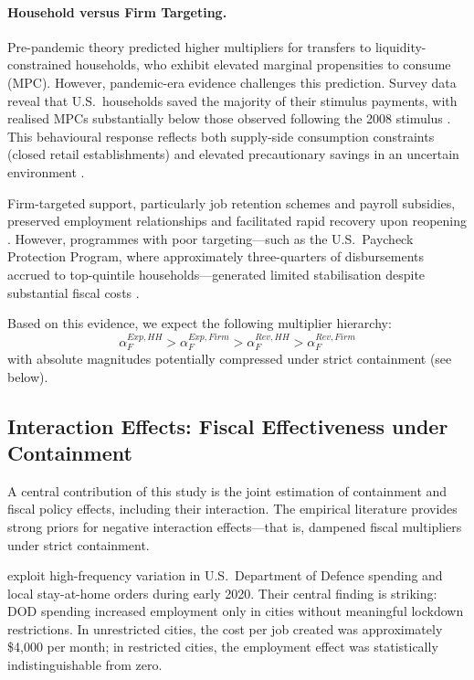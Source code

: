 \documentclass[12pt, a4paper]{article}
\begin{document}
\paragraph{Household versus Firm Targeting.}
Pre-pandemic theory predicted higher multipliers for transfers to liquidity-constrained households, who exhibit elevated marginal propensities to consume (MPC). However, pandemic-era evidence challenges this prediction. Survey data reveal that U.S.\ households saved the majority of their stimulus payments, with realised MPCs substantially below those observed following the 2008 stimulus \citep{Coibion2020}. This behavioural response reflects both supply-side consumption constraints (closed retail establishments) and elevated precautionary savings in an uncertain environment \citep{Chetty2020}.

Firm-targeted support, particularly job retention schemes and payroll subsidies, preserved employment relationships and facilitated rapid recovery upon reopening \citep{Giupponi2022}. However, programmes with poor targeting---such as the U.S.\ Paycheck Protection Program, where approximately three-quarters of disbursements accrued to top-quintile households---generated limited stabilisation despite substantial fiscal costs \citep{Autor2022}.

Based on this evidence, we expect the following multiplier hierarchy:
\begin{equation}
    \alpha^{Exp,HH}_F > \alpha^{Exp,Firm}_F > \alpha^{Rev,HH}_F > \alpha^{Rev,Firm}_F
\end{equation}
with absolute magnitudes potentially compressed under strict containment (see below).

\subsection{Interaction Effects: Fiscal Effectiveness under Containment}
\label{subsec:interaction}

A central contribution of this study is the joint estimation of containment and fiscal policy effects, including their interaction. The empirical literature provides strong priors for negative interaction effects---that is, dampened fiscal multipliers under strict containment.

\citet{Auerbach2022} exploit high-frequency variation in U.S.\ Department of Defence spending and local stay-at-home orders during early 2020. Their central finding is striking: DOD spending increased employment only in cities without meaningful lockdown restrictions. In unrestricted cities, the cost per job created was approximately \$4,000 per month; in restricted cities, the employment effect was statistically indistinguishable from zero.
\end{document}

